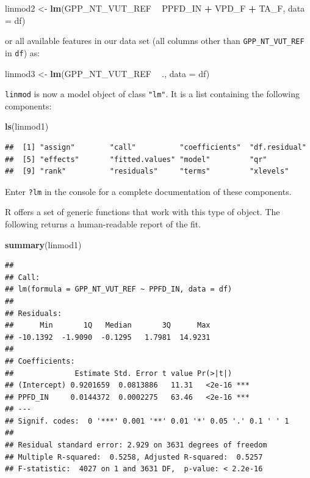 \documentclass[
]{book}
\newenvironment{Shaded}{\begin{snugshade}}{\end{snugshade}}
\newcommand{\DataTypeTok}[1]{\textcolor[rgb]{0.13,0.29,0.53}{#1}}
\newcommand{\KeywordTok}[1]{\textcolor[rgb]{0.13,0.29,0.53}{\textbf{#1}}}
\newcommand{\NormalTok}[1]{#1}
\newcommand{\OperatorTok}[1]{\textcolor[rgb]{0.81,0.36,0.00}{\textbf{#1}}}
\newcommand{\StringTok}[1]{\textcolor[rgb]{0.31,0.60,0.02}{#1}}
\begin{document}
\begin{Shaded}
\begin{Highlighting}[]
\NormalTok{linmod2 <-}\StringTok{ }\KeywordTok{lm}\NormalTok{(GPP_NT_VUT_REF }\OperatorTok{~}\StringTok{ }\NormalTok{PPFD_IN }\OperatorTok{+}\StringTok{ }\NormalTok{VPD_F }\OperatorTok{+}\StringTok{ }\NormalTok{TA_F, }\DataTypeTok{data =}\NormalTok{ df)}
\end{Highlighting}
\end{Shaded}

or all available features in our data set (all columns other than \texttt{GPP\_NT\_VUT\_REF} in \texttt{df}) as:

\begin{Shaded}
\begin{Highlighting}[]
\NormalTok{linmod3 <-}\StringTok{ }\KeywordTok{lm}\NormalTok{(GPP_NT_VUT_REF }\OperatorTok{~}\StringTok{ }\NormalTok{., }\DataTypeTok{data =}\NormalTok{ df)}
\end{Highlighting}
\end{Shaded}

\texttt{linmod} is now a model object of class \texttt{"lm"}. It is a list containing the following components:

\begin{Shaded}
\begin{Highlighting}[]
\KeywordTok{ls}\NormalTok{(linmod1)}
\end{Highlighting}
\end{Shaded}

\begin{verbatim}
##  [1] "assign"        "call"          "coefficients"  "df.residual"  
##  [5] "effects"       "fitted.values" "model"         "qr"           
##  [9] "rank"          "residuals"     "terms"         "xlevels"
\end{verbatim}

Enter \texttt{?lm} in the console for a complete documentation of these components.

R offers a set of generic functions that work with this type of object. The following returns a human-readable report of the fit.

\begin{Shaded}
\begin{Highlighting}[]
\KeywordTok{summary}\NormalTok{(linmod1)}
\end{Highlighting}
\end{Shaded}

\begin{verbatim}
## 
## Call:
## lm(formula = GPP_NT_VUT_REF ~ PPFD_IN, data = df)
## 
## Residuals:
##      Min       1Q   Median       3Q      Max 
## -10.1392  -1.9090  -0.1295   1.7981  14.9231 
## 
## Coefficients:
##              Estimate Std. Error t value Pr(>|t|)    
## (Intercept) 0.9201659  0.0813886   11.31   <2e-16 ***
## PPFD_IN     0.0144372  0.0002275   63.46   <2e-16 ***
## ---
## Signif. codes:  0 '***' 0.001 '**' 0.01 '*' 0.05 '.' 0.1 ' ' 1
## 
## Residual standard error: 2.929 on 3631 degrees of freedom
## Multiple R-squared:  0.5258, Adjusted R-squared:  0.5257 
## F-statistic:  4027 on 1 and 3631 DF,  p-value: < 2.2e-16
\end{verbatim}
\end{document}
